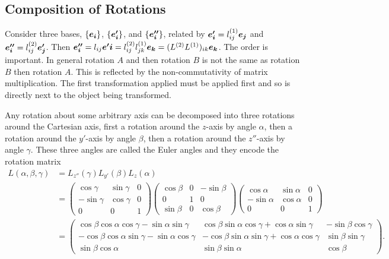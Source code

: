 \subsection{Composition of Rotations}
Consider three bases, \(\{\bm{e_{i}}\}\), \(\{\bm{e'_i}\}\), and \(\{\bm{e''_i}\}\), related by \(\bm{e'_i} = l^{(1)}_{ij}\bm{e_{j}}\) and \(\bm{e''_i} = l^{(2)}_{ij}\bm{e'_j}\).
Then \(\bm{e''_i} = l_{ij}\bm{e'i} = l^{(2)}_{ij}l^{(1)}_{jk}\bm{e_{k}} = (L^{(2)}L^{(1)})_{ik}\bm{e_{k}}\).
The order is important.
In general rotation \(A\) and then rotation \(B\) is not the same as rotation \(B\) then rotation \(A\).
This is reflected by the non-commutativity of matrix multiplication.
The first transformation applied must be applied first and so is directly next to the object being transformed.

Any rotation about some arbitrary axis can be decomposed into three rotations around the Cartesian axis, first a rotation around the \(z\)-axis by angle \(\alpha\), then a rotation around the \(y'\)-axis by angle \(\beta\), then a rotation around the \(z''\)-axis by angle \(\gamma\).
These three angles are called the Euler angles and they encode the rotation matrix
\begin{align*}
    L(\alpha, \beta, \gamma) &= L_{z''}(\gamma)L_{y'}(\beta)L_{z}(\alpha)\\
    &=
    \begin{pmatrix}
        \cos\gamma & \sin\gamma & 0\\
        -\sin\gamma & \cos\gamma & 0\\
        0 & 0 & 1
    \end{pmatrix}
    \begin{pmatrix}
        \cos\beta & 0 & -\sin\beta\\
        0 & 1 & 0\\
        \sin\beta & 0 & \cos\beta
    \end{pmatrix}
    \begin{pmatrix}
        \cos\alpha & \sin\alpha & 0\\
        -\sin\alpha & \cos\alpha & 0\\
        0 & 0 & 1
    \end{pmatrix}
    \\
    &=
    \begin{pmatrix}
        \cos\beta\cos\alpha\cos\gamma - \sin\alpha\sin\gamma & \cos\beta\sin\alpha\cos\gamma + \cos\alpha\sin\gamma & -\sin\beta\cos\gamma\\
        -\cos\beta\cos\alpha\sin\gamma - \sin\alpha\cos\gamma & -\cos\beta\sin\alpha\sin\gamma + \cos\alpha\cos\gamma & \sin\beta\sin\gamma\\
        \sin\beta\cos\alpha & \sin\beta\sin\alpha & \cos\beta
    \end{pmatrix}
    .
\end{align*}

